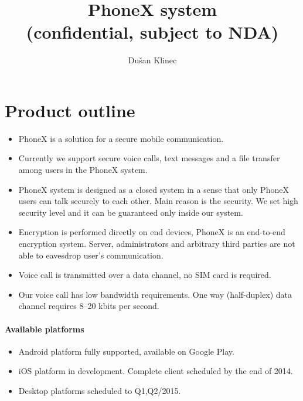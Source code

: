 \documentclass[a4paper,10pt]{article}
\title{PhoneX system \\ (confidential, subject to NDA)}
\author{Du\v{s}an Klinec}
\date{}
\begin{document}
\maketitle

\section{Product outline}
\begin{itemize}
 \item PhoneX is a solution for a secure mobile communication.
 \item Currently we support secure voice calls, text messages and a file transfer among users in the PhoneX system.
 \item PhoneX system is designed as a closed system in a sense that only PhoneX users can talk securely to each other. Main reason is the security. We set high security level
and it can be guaranteed only inside our system.
 \item Encryption is performed directly on end devices, PhoneX is an end-to-end encryption system. Server, administrators and arbitrary third parties are not 
able to eavesdrop user's communication.
 \item Voice call is transmitted over a data channel, no SIM card is required.
 \item Our voice call has low bandwidth requirements. One way (half-duplex) data channel requires 8--20 kbits per second.
\end{itemize}

\paragraph{Available platforms}
\begin{itemize}
 \item Android platform fully supported, available on Google Play.
 \item iOS platform in development. Complete client scheduled by the end of 2014.
 \item Desktop platforms scheduled to Q1,Q2/2015.
\end{itemize}
\end{document}
